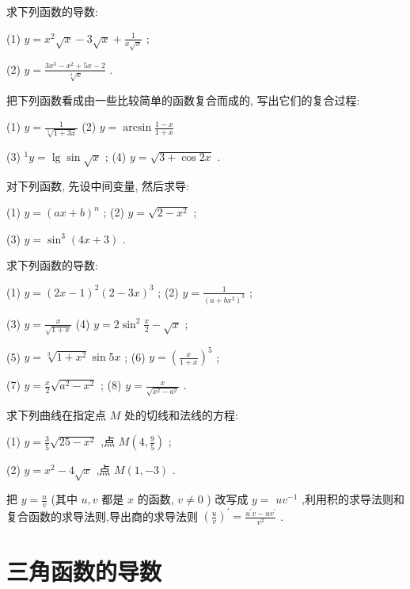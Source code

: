 \documentclass[lang=cn,newtx,10pt,scheme=chinese]{elegantbook}
\begin{document}
\begin{problemset}[习 题 五]
\item 求下列函数的导数:

(1) \(y = {x}^{2}\sqrt{x} - 3\sqrt{x} + \frac{1}{x\sqrt{x}}\) ;

(2) \(y = \frac{3{x}^{3} - {x}^{2} + {5x} - 2}{\sqrt[3]{x}}\) .

\item 把下列函数看成由一些比较简单的函数复合而成的, 写出它们的复合过程:

(1) \(y = \frac{1}{\sqrt[5]{1 + {3x}}}\) (2) \(y = \arcsin \frac{1 - x}{1 + x}\)

(3) \({}^{1}y = \lg \sin \sqrt{x}\) ; (4) \(y = \sqrt{3 + \cos {2x}}\) .

\item 对下列函数, 先设中间变量, 然后求导:

(1) \(y = {\left( ax + b\right) }^{n}\) ; (2) \(y = \sqrt{2 - {x}^{2}}\) ;

(3) \(y = {\sin }^{3}\left( {{4x} + 3}\right)\) .

\item 求下列函数的导数:

(1) \(y = {\left( 2x - 1\right) }^{2}{\left( 2 - 3x\right) }^{3}\) ; (2) \(y = \frac{1}{{\left( a + b{x}^{2}\right) }^{3}}\) ;

(3) \(y = \frac{x}{\sqrt{1 + x}}\) (4) \(y = 2{\sin }^{2}\frac{x}{2} - \sqrt{x}\) ;

(5) \(y = \sqrt[3]{1 + {x}^{2}}\sin {5x}\) ; (6) \(y = {\left( \frac{x}{1 + x}\right) }^{5}\) ;

(7) \(y = \frac{x}{2}\sqrt{{a}^{2} - {x}^{2}}\) ; (8) \(y = \frac{x}{\sqrt{{x}^{2} - {a}^{2}}}\) .

\item 求下列曲线在指定点 \(M\) 处的切线和法线的方程:

(1) \(y = \frac{3}{5}\sqrt{{25} - {x}^{2}}\) ,点 \(M\left( {4,\frac{9}{5}}\right)\) ;

(2) \(y = {x}^{2} - 4\sqrt{x}\) ,点 \(M\left( {1, - 3}\right)\) .

\item 把 \(y = \frac{u}{v}\) (其中 \(u,v\) 都是 \(x\) 的函数, \(v \neq 0\) ) 改写成 \(y =\) \(u{v}^{-1}\) ,利用积的求导法则和复合函数的求导法则,导出商的求导法则 \({\left( \frac{u}{v}\right) }^{\prime } = \frac{{u}^{\prime }v - u{v}^{\prime }}{{v}^{2}}\) .

\end{problemset}

\section{三角函数的导数}
\end{document}
